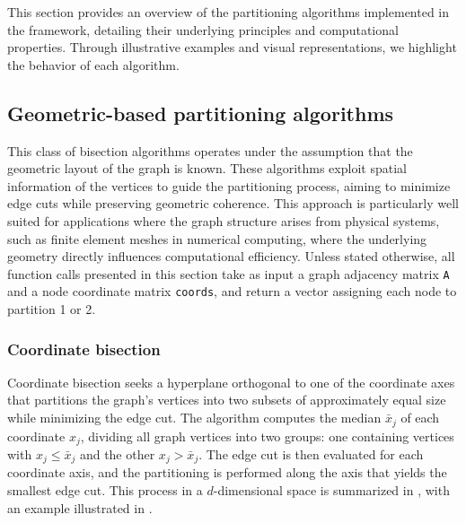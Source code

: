 \documentclass[../paper.tex]{subfiles}
\begin{document}
    This section provides an overview of the partitioning algorithms implemented
    in the framework, detailing their underlying principles and computational properties.
    Through illustrative examples and visual representations, we highlight the behavior of each algorithm.

    \subsection{Geometric-based partitioning algorithms}
    \label{subsec:geo}
    This class of bisection algorithms operates under the assumption that the geometric layout of the
    graph is known.
    These algorithms exploit spatial information of the vertices to guide the
    partitioning process, aiming to minimize edge cuts while preserving geometric
    coherence\cite{doi:10.1137/S1064827594275339}.
    This approach is particularly well suited for applications where the graph structure
    arises from physical systems, such as finite element meshes in numerical computing,
    where the underlying geometry directly influences computational efficiency\cite{buluc2015recentadvancesgraphpartitioning}. Unless stated otherwise, all function calls presented in this section take as input a graph adjacency matrix \texttt{A} and a node coordinate matrix \texttt{coords}, and return a vector assigning each node to partition 1 or 2.
    \subsubsection{Coordinate bisection}
    \label{subsubsec:coord}
    Coordinate bisection seeks a hyperplane orthogonal to one of the coordinate axes that partitions the graph's vertices into two subsets of approximately equal size
    while minimizing the edge cut.
    The algorithm computes the median $\bar{x}_j$ of each coordinate $x_j$,
    dividing all graph vertices into two groups: one containing vertices with $x_j \leq \bar{x}_j$ and the other $x_j > \bar{x}_j$. The edge cut is then evaluated for each coordinate axis, and the
    partitioning is performed along the axis that yields the smallest edge cut.
    This process in a $d$-dimensional space is summarized in , with an example illustrated in .
    
    
    
\end{document}

